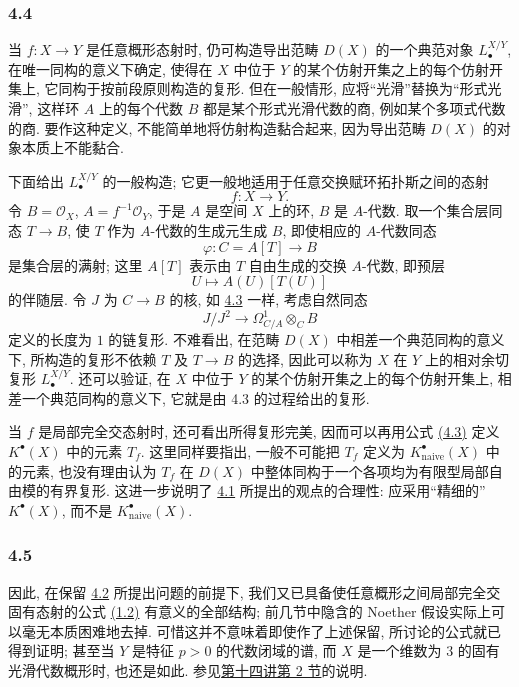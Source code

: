 \subsubsection*{4.4}
当 $f:X\to Y$ 是任意概形态射时, 仍可构造导出范畴 $D(X)$ 的一个典范对象 $L^{X/Y}_\bullet$, 在唯一同构的意义下确定, 使得在 $X$ 中位于 $Y$ 的某个仿射开集之上的每个仿射开集上, 它同构于按前段原则构造的复形. 但在一般情形, 应将“光滑”替换为“形式光滑”, 这样环 $A$ 上的每个代数 $B$ 都是某个形式光滑代数的商, 例如某个多项式代数的商. 要作这种定义, 不能简单地将仿射构造黏合起来, 因为导出范畴 $D(X)$ 的对象本质上不能黏合.

下面给出 $L^{X/Y}_\bullet$ 的一般构造; 它更一般地适用于任意交换赋环拓扑斯之间的态射
\[
f:X\longrightarrow Y.
\]
令 $B=\mathcal O_X$, $A=f^{-1}\mathcal O_Y$, 于是 $A$ 是空间 $X$ 上的环, $B$ 是 $A$-代数. 取一个集合层同态 $T\to B$, 使 $T$ 作为 $A$-代数的生成元生成 $B$, 即使相应的 $A$-代数同态
\[
\varphi:C=A[T]\longrightarrow B
\]
是集合层的满射; 这里 $A[T]$ 表示由 $T$ 自由生成的交换 $A$-代数, 即预层
\[
U\longmapsto A(U)[T(U)]
\]
的伴随层. 令 $J$ 为 $C\to B$ 的核, 如 \hyperlink{sga6.e00.sec.4.3}{4.3} 一样, 考虑自然同态
\[
J/J^2\longrightarrow \Omega^1_{C/A}\otimes_C B
\]
定义的长度为 $1$ 的链复形. 不难看出, 在范畴 $D(X)$ 中相差一个典范同构的意义下, 所构造的复形不依赖 $T$ 及 $T\to B$ 的选择, 因此可以称为 $X$ 在 $Y$ 上的相对余切复形 $L^{X/Y}_\bullet$. 还可以验证, 在 $X$ 中位于 $Y$ 的某个仿射开集之上的每个仿射开集上, 相差一个典范同构的意义下, 它就是由 4.3 的过程给出的复形.

当 $f$ 是局部完全交态射时, 还可看出所得复形完美, 因而可以再用公式 \hyperlink{sga6.e00.eq.4-3}{(4.3)} 定义 $K^\bullet(X)$ 中的元素 $T_f$. 这里同样要指出, 一般不可能把 $T_f$ 定义为 $K^\bullet_{\mathrm{naive}}(X)$ 中的元素, 也没有理由认为 $T_f$ 在 $D(X)$ 中整体同构于一个各项均为有限型局部自由模的有界复形. 这进一步说明了 \hyperlink{sga6.e00.sec.4.1}{4.1} 所提出的观点的合理性: 应采用“精细的” $K^\bullet(X)$, 而不是 $K^\bullet_{\mathrm{naive}}(X)$.

\subsubsection*{4.5}
因此, 在保留 \hyperlink{sga6.e00.sec.4.2}{4.2} 所提出问题的前提下, 我们又已具备使任意概形之间局部完全交固有态射的公式 \hyperlink{sga6.e00.eq.1-2}{(1.2)} 有意义的全部结构; 前几节中隐含的 Noether 假设实际上可以毫无本质困难地去掉. 可惜这并不意味着即使作了上述保留, 所讨论的公式就已得到证明; 甚至当 $Y$ 是特征 $p>0$ 的代数闭域的谱, 而 $X$ 是一个维数为 $3$ 的固有光滑代数概形时, 也还是如此. 参见\hyperlink{sga6.e14.sec.2}{第十四讲第 2 节}的说明.

